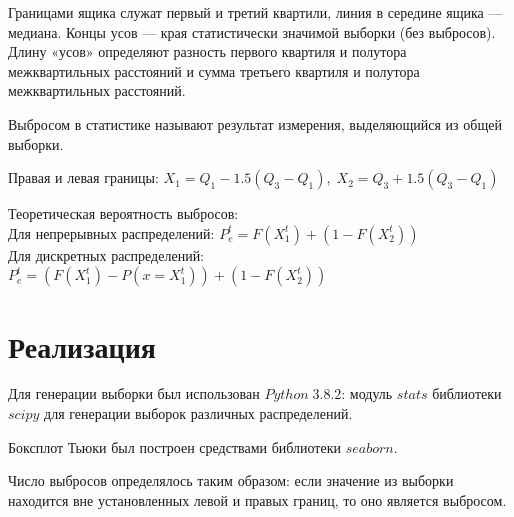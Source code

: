 \documentclass[a4]{article}
\begin{document}
Границами ящика служат первый и третий квартили, линия в середине
ящика — медиана. Концы усов — края статистически значимой выборки
(без выбросов). Длину «усов» определяют разность первого квартиля и полутора межквартильных расстояний и сумма третьего квартиля и полутора межквартильных расстояний. 

Выбросом в статистике называют результат измерения, выделяющийся из общей выборки.

Правая и левая границы:  $X_{1} = Q_{1} - 1.5(Q_{3} - Q_{1}),\;X_{2} = Q_{3} + 1.5(Q_{3} - Q_{1})$

Теоретическая вероятность выбросов:\\
Для непрерывных распределений:
$P^{t}_{e} = F(X_{1}^{t}) + (1 - F(X_{2}^{t}))$\\
Для дискретных распределений:
$P^{t}_{e} = (F(X_{1}^{t}) - P(x=X_{1}^{t})) + (1 - F(X_{2}^{t}))$

\section{Реализация}
Для генерации выборки был использован $Python\;3.8.2$: модуль $stats$ библиотеки $scipy$ для генерации выборок различных распределений.

Боксплот Тьюки был построен средствами библиотеки $seaborn$.

Число выбросов определялось таким образом: если значение из выборки находится вне установленных левой и правых границ, то оно является выбросом.


\newpage
\end{document}
